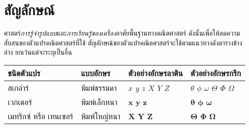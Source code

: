 \clearpage

\section*{สัญลักษณ์}

ศาสตร์\textit{การรู้จำรูปแบบ}และ\textit{การเรียนรู้ของเครื่อง}อาศัยพื้นฐานทางคณิตศาสตร์ 
ดังนั้นเพื่อให้ลดความสับสนของตัวแปรคณิตศาสตร์ที่ใช้ 
สัญลักษณ์ของตัวแปรคณิตศาสตร์จะใช้ตามแนวทางดังตารางข้างล่าง ยกเว้นแต่จะระบุเป็นอื่น

\begin{tabular}{ |>{\arraybackslash}m{1.6in}  |>{\arraybackslash}m{1.3in} 
		|>{\arraybackslash}m{1.4in} |>{\arraybackslash}m{1.4in}|}
	\hline 
	ชนิดตัวแปร & แบบอักษร & ตัวอย่างอักษรลาติน & ตัวอย่างอักษรกรีก \\ 
	\hline 
	สเกล่าร์ & พิมพ์ธรรมดา & $x$ $y$ $z$ $X$ $Y$ $Z$ & 
	$\theta$ $\phi$ $\omega$ 
	$\Theta$ $\Phi$ $\Omega$
	\\ 
	\hline 
	เวกเตอร์ & พิมพ์เล็กหนา & 
	$\bm{x}$ $\bm{y}$ $\bm{z}$ & 
	$\bm{\theta}$ $\bm{\phi}$ $\bm{\omega}$ \\ 
	\hline 
	เมทริกซ์ หรือ เทนเซอร์
	& พิมพ์ใหญ่หนา & $\bm{X}$ $\bm{Y}$ $\bm{Z}$ & 
	$\bm{\Theta}$ $\bm{\Phi}$ $\bm{\Omega}$ \\  
	\hline 
\end{tabular} 
\vspace{0.5cm}

